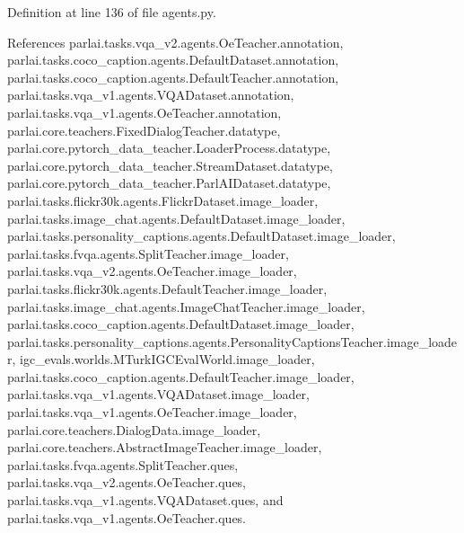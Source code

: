 Definition at line 136 of file agents.\+py.



References parlai.\+tasks.\+vqa\+\_\+v2.\+agents.\+Oe\+Teacher.\+annotation, parlai.\+tasks.\+coco\+\_\+caption.\+agents.\+Default\+Dataset.\+annotation, parlai.\+tasks.\+coco\+\_\+caption.\+agents.\+Default\+Teacher.\+annotation, parlai.\+tasks.\+vqa\+\_\+v1.\+agents.\+V\+Q\+A\+Dataset.\+annotation, parlai.\+tasks.\+vqa\+\_\+v1.\+agents.\+Oe\+Teacher.\+annotation, parlai.\+core.\+teachers.\+Fixed\+Dialog\+Teacher.\+datatype, parlai.\+core.\+pytorch\+\_\+data\+\_\+teacher.\+Loader\+Process.\+datatype, parlai.\+core.\+pytorch\+\_\+data\+\_\+teacher.\+Stream\+Dataset.\+datatype, parlai.\+core.\+pytorch\+\_\+data\+\_\+teacher.\+Parl\+A\+I\+Dataset.\+datatype, parlai.\+tasks.\+flickr30k.\+agents.\+Flickr\+Dataset.\+image\+\_\+loader, parlai.\+tasks.\+image\+\_\+chat.\+agents.\+Default\+Dataset.\+image\+\_\+loader, parlai.\+tasks.\+personality\+\_\+captions.\+agents.\+Default\+Dataset.\+image\+\_\+loader, parlai.\+tasks.\+fvqa.\+agents.\+Split\+Teacher.\+image\+\_\+loader, parlai.\+tasks.\+vqa\+\_\+v2.\+agents.\+Oe\+Teacher.\+image\+\_\+loader, parlai.\+tasks.\+flickr30k.\+agents.\+Default\+Teacher.\+image\+\_\+loader, parlai.\+tasks.\+image\+\_\+chat.\+agents.\+Image\+Chat\+Teacher.\+image\+\_\+loader, parlai.\+tasks.\+coco\+\_\+caption.\+agents.\+Default\+Dataset.\+image\+\_\+loader, parlai.\+tasks.\+personality\+\_\+captions.\+agents.\+Personality\+Captions\+Teacher.\+image\+\_\+loader, igc\+\_\+evals.\+worlds.\+M\+Turk\+I\+G\+C\+Eval\+World.\+image\+\_\+loader, parlai.\+tasks.\+coco\+\_\+caption.\+agents.\+Default\+Teacher.\+image\+\_\+loader, parlai.\+tasks.\+vqa\+\_\+v1.\+agents.\+V\+Q\+A\+Dataset.\+image\+\_\+loader, parlai.\+tasks.\+vqa\+\_\+v1.\+agents.\+Oe\+Teacher.\+image\+\_\+loader, parlai.\+core.\+teachers.\+Dialog\+Data.\+image\+\_\+loader, parlai.\+core.\+teachers.\+Abstract\+Image\+Teacher.\+image\+\_\+loader, parlai.\+tasks.\+fvqa.\+agents.\+Split\+Teacher.\+ques, parlai.\+tasks.\+vqa\+\_\+v2.\+agents.\+Oe\+Teacher.\+ques, parlai.\+tasks.\+vqa\+\_\+v1.\+agents.\+V\+Q\+A\+Dataset.\+ques, and parlai.\+tasks.\+vqa\+\_\+v1.\+agents.\+Oe\+Teacher.\+ques.

\mbox{\label{classparlai_1_1tasks_1_1vqa__v2_1_1agents_1_1OeTeacher_afc1a8af21f49e95d90ee64af6c560f1b}} 
